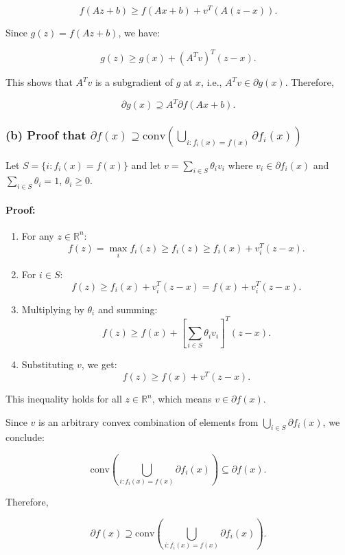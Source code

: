 \documentclass{article}
\begin{document}
$$f(Az + b) \geq f(Ax + b) + v^T (A(z - x)).$$

Since $g(z) = f(Az + b)$, we have:

$$g(z) \geq g(x) + (A^T v)^T (z - x).$$

This shows that $A^T v$ is a subgradient of $g$ at $x$, i.e., $A^T v \in \partial g(x)$. Therefore,

$$\partial g(x) \supseteq A^T\partial f(Ax + b).$$

\subsubsection*{(b) Proof that $\partial f(x) \supseteq \text{conv}\left( \bigcup_{i: f_i(x) = f(x)} \partial f_i(x) \right)$}

Let $S = \{i: f_i(x) = f(x)\}$ and let $v = \sum_{i \in S} \theta_i v_i$ where $v_i \in \partial f_i(x)$ and $\sum_{i \in S} \theta_i = 1$, $\theta_i \geq 0$.

\paragraph{Proof:}
\begin{enumerate}
\item For any $z \in \mathbb{R}^n$:
   $$f(z) = \max_i f_i(z) \geq f_i(z) \geq f_i(x) + v_i^T(z - x).$$

\item For $i \in S$:
   $$f(z) \geq f_i(x) + v_i^T(z - x) = f(x) + v_i^T(z - x).$$

\item Multiplying by $\theta_i$ and summing:
   $$f(z) \geq f(x) + [\sum_{i \in S} \theta_i v_i]^T (z - x).$$

\item Substituting $v$, we get:
   $$f(z) \geq f(x) + v^T (z - x).$$
\end{enumerate}

This inequality holds for all $z \in \mathbb{R}^n$, which means $v \in \partial f(x)$.

Since $v$ is an arbitrary convex combination of elements from $\bigcup_{i \in S} \partial f_i(x)$, we conclude:

$$\text{conv}\left( \bigcup_{i: f_i(x) = f(x)} \partial f_i(x) \right) \subseteq \partial f(x).$$

Therefore,

$$\partial f(x) \supseteq \text{conv}\left( \bigcup_{i: f_i(x) = f(x)} \partial f_i(x) \right).$$
\end{document}
